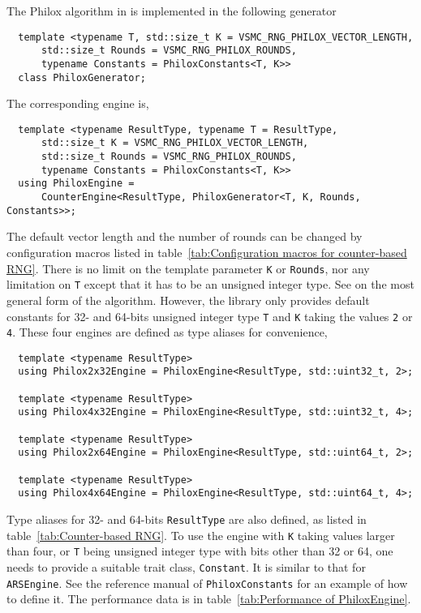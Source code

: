 The Philox algorithm in \textcite{Salmon:2011um} is implemented in the
following generator
\begin{Verbatim}
  template <typename T, std::size_t K = VSMC_RNG_PHILOX_VECTOR_LENGTH,
      std::size_t Rounds = VSMC_RNG_PHILOX_ROUNDS,
      typename Constants = PhiloxConstants<T, K>>
  class PhiloxGenerator;
\end{Verbatim}
The corresponding \rng engine is,
\begin{Verbatim}
  template <typename ResultType, typename T = ResultType,
      std::size_t K = VSMC_RNG_PHILOX_VECTOR_LENGTH,
      std::size_t Rounds = VSMC_RNG_PHILOX_ROUNDS,
      typename Constants = PhiloxConstants<T, K>>
  using PhiloxEngine =
      CounterEngine<ResultType, PhiloxGenerator<T, K, Rounds, Constants>>;
\end{Verbatim}
The default vector length and the number of rounds can be changed by
configuration macros listed in table~\ref{tab:Configuration macros for
  counter-based RNG}. There is no limit on the template parameter \verb|K| or
\verb|Rounds|, nor any limitation on \verb|T| except that it has to be an
unsigned integer type. See \textcite{Salmon:2011um} on the most general form of
the algorithm. However, the library only provides default constants for 32- and
64-bits unsigned integer type \verb|T| and \verb|K| taking the values \verb|2|
or \verb|4|. These four engines are defined as type aliases for convenience,
\begin{Verbatim}
  template <typename ResultType>
  using Philox2x32Engine = PhiloxEngine<ResultType, std::uint32_t, 2>;

  template <typename ResultType>
  using Philox4x32Engine = PhiloxEngine<ResultType, std::uint32_t, 4>;

  template <typename ResultType>
  using Philox2x64Engine = PhiloxEngine<ResultType, std::uint64_t, 2>;

  template <typename ResultType>
  using Philox4x64Engine = PhiloxEngine<ResultType, std::uint64_t, 4>;
\end{Verbatim}
Type aliases for 32- and 64-bits \verb|ResultType| are also defined, as listed
in table~\ref{tab:Counter-based RNG}. To use the engine with \verb|K| taking
values larger than four, or \verb|T| being unsigned integer type with bits
other than 32 or 64, one needs to provide a suitable trait class,
\verb|Constant|. It is similar to that for \verb|ARSEngine|. See the reference
manual of \verb|PhiloxConstants| for an example of how to define it. The
performance data is in table~\ref{tab:Performance of PhiloxEngine}.

